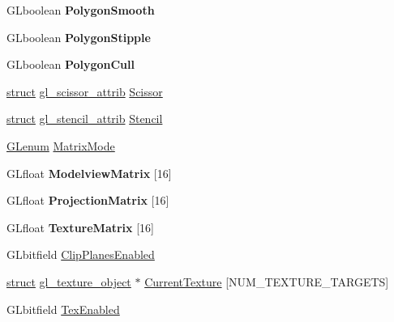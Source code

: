 \begin{DoxyCompactItemize}
\item 
\mbox{\label{structsave__state_a5be8a3d0560b5658773e0422e9926bfa}} 
G\+Lboolean {\bfseries Polygon\+Smooth}
\item 
\mbox{\label{structsave__state_ac6cc0b48d5849537d0e34df537b64bdf}} 
G\+Lboolean {\bfseries Polygon\+Stipple}
\item 
\mbox{\label{structsave__state_a13c335d6701e61a55c88c72158a63a5e}} 
G\+Lboolean {\bfseries Polygon\+Cull}
\item 
\hyperlink{interfacestruct}{struct} \hyperlink{structgl__scissor__attrib}{gl\+\_\+scissor\+\_\+attrib} \hyperlink{structsave__state_a065b079b36b52124dde270c84d1aea8b}{Scissor}
\item 
\hyperlink{interfacestruct}{struct} \hyperlink{structgl__stencil__attrib}{gl\+\_\+stencil\+\_\+attrib} \hyperlink{structsave__state_aa53295b6115d8fe4af2f56fab2654daa}{Stencil}
\item 
\hyperlink{interfacevoid}{G\+Lenum} \hyperlink{structsave__state_a352f8c2f8f4687c85a2caae38783c0d3}{Matrix\+Mode}
\item 
\mbox{\label{structsave__state_a0db70100faf891433aa175af3e4036f7}} 
G\+Lfloat {\bfseries Modelview\+Matrix} \mbox{[}16\mbox{]}
\item 
\mbox{\label{structsave__state_a2ddc7d1d3a8b38bad22aa51888978a3a}} 
G\+Lfloat {\bfseries Projection\+Matrix} \mbox{[}16\mbox{]}
\item 
\mbox{\label{structsave__state_a203cc38d85b1b7f35bf7ce07d97f4d10}} 
G\+Lfloat {\bfseries Texture\+Matrix} \mbox{[}16\mbox{]}
\item 
G\+Lbitfield \hyperlink{structsave__state_a8c8c51a0700062095ea517da55d98c33}{Clip\+Planes\+Enabled}
\item 
\hyperlink{interfacestruct}{struct} \hyperlink{structgl__texture__object}{gl\+\_\+texture\+\_\+object} $\ast$ \hyperlink{structsave__state_ae11ed66096a76fa3453f87ef343cec97}{Current\+Texture} \mbox{[}N\+U\+M\+\_\+\+T\+E\+X\+T\+U\+R\+E\+\_\+\+T\+A\+R\+G\+E\+TS\mbox{]}
\item 
G\+Lbitfield \hyperlink{structsave__state_a018ac9eef641070b7ba9ec5164f33366}{Tex\+Enabled}
\item 

\end{DoxyCompactItemize}
